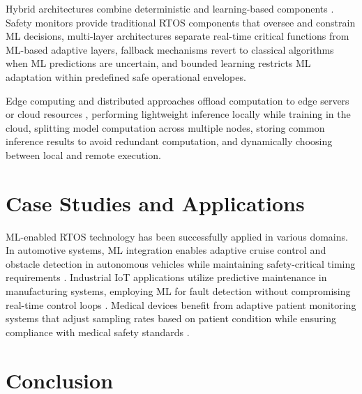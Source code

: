 \documentclass[11pt,a4paper]{article}
\begin{document}
Hybrid architectures combine deterministic and learning-based components \cite{lee2017introduction}. Safety monitors provide traditional RTOS components that oversee and constrain ML decisions, multi-layer architectures separate real-time critical functions from ML-based adaptive layers, fallback mechanisms revert to classical algorithms when ML predictions are uncertain, and bounded learning restricts ML adaptation within predefined safe operational envelopes.

Edge computing and distributed approaches offload computation to edge servers or cloud resources \cite{warden2019tinyml}, performing lightweight inference locally while training in the cloud, splitting model computation across multiple nodes, storing common inference results to avoid redundant computation, and dynamically choosing between local and remote execution.

\section{Case Studies and Applications}

ML-enabled RTOS technology has been successfully applied in various domains. In automotive systems, ML integration enables adaptive cruise control and obstacle detection in autonomous vehicles while maintaining safety-critical timing requirements \cite{buttazzo2011hard}. Industrial IoT applications utilize predictive maintenance in manufacturing systems, employing ML for fault detection without compromising real-time control loops \cite{warden2019tinyml}. Medical devices benefit from adaptive patient monitoring systems that adjust sampling rates based on patient condition while ensuring compliance with medical safety standards \cite{warden2019tinyml}.

\section{Conclusion}
\end{document}
